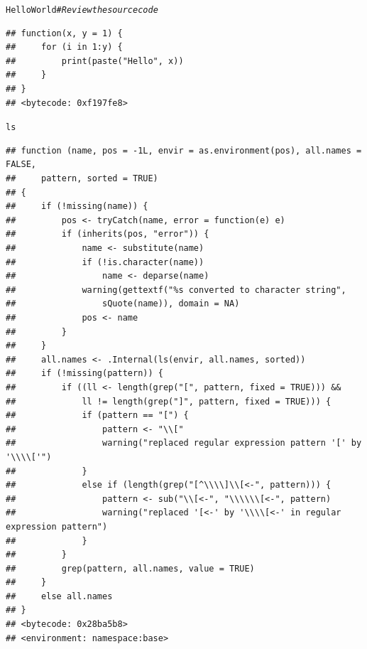 \documentclass{beamer}\usepackage[]{graphicx}\usepackage[]{color}
\makeatletter
\newcommand{\hlcom}[1]{\textcolor[rgb]{0.678,0.584,0.686}{\textit{#1}}}%
\newcommand{\hlstd}[1]{\textcolor[rgb]{0.345,0.345,0.345}{#1}}%
\newenvironment{kframe}{%
 \def\at@end@of@kframe{}%
 \ifinner\ifhmode%
  \def\at@end@of@kframe{\end{minipage}}%
  \begin{minipage}{\columnwidth}%
 \fi\fi%
 \def\FrameCommand##1{\hskip\@totalleftmargin \hskip-\fboxsep
 \colorbox{shadecolor}{##1}\hskip-\fboxsep
     \hskip-\linewidth \hskip-\@totalleftmargin \hskip\columnwidth}%
 \MakeFramed {\advance\hsize-\width
   \@totalleftmargin\z@ \linewidth\hsize
   \@setminipage}}%
 {\par\unskip\endMakeFramed%
 \at@end@of@kframe}
\newenvironment{knitrout}{}{} %
\makeatother
\begin{document}
\begin{frame}
\begin{knitrout}\scriptsize
{}\color{fgcolor}\begin{kframe}
\begin{alltt}
\hlstd{HelloWorld}  \hlcom{# Review the source code}
\end{alltt}
\begin{verbatim}
## function(x, y = 1) {
##     for (i in 1:y) {
##         print(paste("Hello", x))
##     }
## }
## <bytecode: 0xf197fe8>
\end{verbatim}
\begin{alltt}
\hlstd{ls}
\end{alltt}
\begin{verbatim}
## function (name, pos = -1L, envir = as.environment(pos), all.names = FALSE, 
##     pattern, sorted = TRUE) 
## {
##     if (!missing(name)) {
##         pos <- tryCatch(name, error = function(e) e)
##         if (inherits(pos, "error")) {
##             name <- substitute(name)
##             if (!is.character(name)) 
##                 name <- deparse(name)
##             warning(gettextf("%s converted to character string", 
##                 sQuote(name)), domain = NA)
##             pos <- name
##         }
##     }
##     all.names <- .Internal(ls(envir, all.names, sorted))
##     if (!missing(pattern)) {
##         if ((ll <- length(grep("[", pattern, fixed = TRUE))) && 
##             ll != length(grep("]", pattern, fixed = TRUE))) {
##             if (pattern == "[") {
##                 pattern <- "\\["
##                 warning("replaced regular expression pattern '[' by  '\\\\['")
##             }
##             else if (length(grep("[^\\\\]\\[<-", pattern))) {
##                 pattern <- sub("\\[<-", "\\\\\\[<-", pattern)
##                 warning("replaced '[<-' by '\\\\[<-' in regular expression pattern")
##             }
##         }
##         grep(pattern, all.names, value = TRUE)
##     }
##     else all.names
## }
## <bytecode: 0x28ba5b8>
## <environment: namespace:base>
\end{verbatim}
\end{kframe}
\end{knitrout}
\end{frame}
\end{document}
